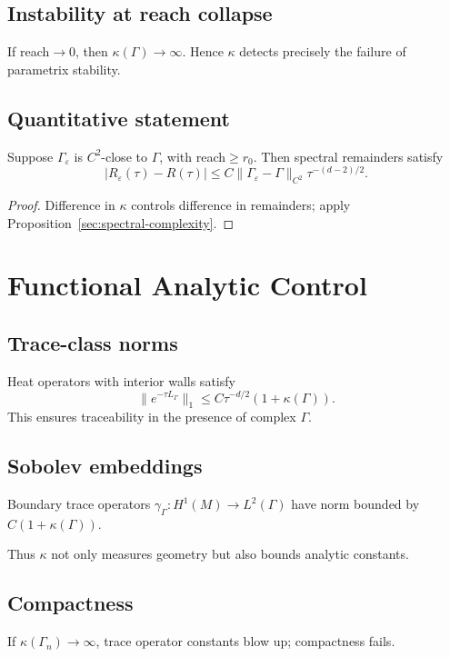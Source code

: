 \subsection{Instability at reach collapse}
If reach$\to 0$, then $\kappa(\Gamma)\to\infty$.
Hence $\kappa$ detects precisely the failure of parametrix stability.

\subsection{Quantitative statement}
\begin{proposition}
Suppose $\Gamma_\varepsilon$ is $C^2$-close to $\Gamma$, with reach$\ge r_0$.
Then spectral remainders satisfy
\[
|R_\varepsilon(\tau)-R(\tau)|\le C\|\Gamma_\varepsilon-\Gamma\|_{C^2}\tau^{-(d-2)/2}.
\]
\end{proposition}

\begin{proof}
Difference in $\kappa$ controls difference in remainders; apply Proposition~\ref{sec:spectral-complexity}.
\end{proof}

\section{Functional Analytic Control}
\label{sec:fa-control}

\subsection{Trace-class norms}
Heat operators with interior walls satisfy
\[
\|e^{-\tau L_\Gamma}\|_{1}\le C\tau^{-d/2}(1+\kappa(\Gamma)).
\]
This ensures traceability in the presence of complex $\Gamma$.

\subsection{Sobolev embeddings}
Boundary trace operators $\gamma_\Gamma:H^1(M)\to L^2(\Gamma)$
have norm bounded by $C(1+\kappa(\Gamma))$.

\begin{remark}
Thus $\kappa$ not only measures geometry but also bounds analytic constants.
\end{remark}

\subsection{Compactness}
If $\kappa(\Gamma_n)\to\infty$, trace operator constants blow up; compactness fails.


